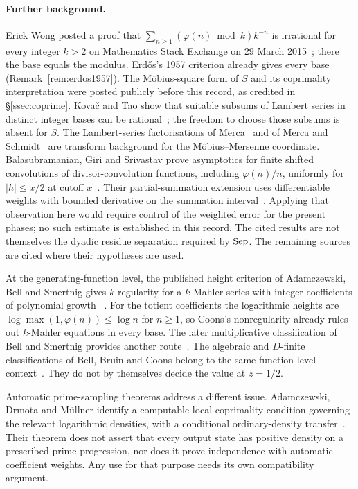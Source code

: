 \documentclass[11pt]{article}
\theoremstyle{plain}
\theoremstyle{definition}
\theoremstyle{remark}
\let\origmathrm\mathrm
\renewcommand{\mathrm}[1]{\ifmmode\origmathrm{#1}\else\textrm{#1}\fi}%
\newcommand{\ph}{\varphi}
\begin{document}
\paragraph{Further background.}
Erick Wong posted a proof that
$\sum_{n\ge1}(\varphi(n)\bmod k)k^{-n}$ is irrational for every integer $k>2$
on Mathematics Stack Exchange on 29 March 2015~\cite{wong2015}; there the base
equals the modulus. Erd\H{o}s's 1957 criterion already gives every base
(Remark~\ref{rem:erdos1957}).  The M\"obius-square form of $S$ and its coprimality
interpretation were posted publicly before this record, as credited in
\S\ref{ssec:coprime}.  Kova\v{c} and Tao show that suitable subsums of Lambert
series in distinct integer bases can be rational~\cite[Theorem~2.3]{kovac-tao};
the freedom to choose those subsums is absent for $S$.  The Lambert-series
factorisations of Merca~\cite[Theorem~1.2]{merca2017} and of Merca and
Schmidt~\cite{merca-schmidt} are transform background for the
M\"obius--Mersenne coordinate.  Balasubramanian, Giri and Srivastav prove
asymptotics for finite shifted convolutions of divisor-convolution
functions, including $\varphi(n)/n$, uniformly for $|h|\le x/2$ at
cutoff $x$~\cite[Theorem~2.2]{bgs2016}. Their partial-summation extension
uses differentiable weights with bounded derivative on the summation
interval~\cite[Rem.~2.9]{bgs2016}.
Applying that observation here would require control of the weighted
error for the present phases; no such estimate is established in this
record. The cited results are not themselves the dyadic residue
separation required by $\mathrm{Sep}$.  The remaining sources are cited where their hypotheses are
used.

At the generating-function level, the published height criterion of
Adamczewski, Bell and Smertnig gives $k$-regularity for a $k$-Mahler
series with integer coefficients of polynomial growth
~\cite[Thm.~1.2(b), p.~2528]{adamczewski-bell-smertnig2023}.
For the totient coefficients the logarithmic heights are
$\log\max(1,\ph(n))\le\log n$ for $n\ge1$, so Coons's nonregularity
already rules out $k$-Mahler equations in every base. The later
multiplicative classification of Bell and Smertnig provides another
route~\cite[Thm.~1.3 and p.~3]{bell-smertnig2026}.
The algebraic and $D$-finite classifications of Bell, Bruin and Coons
belong to the same function-level context~\cite[Thms.~1.5--1.6]{bell-bruin-coons}.
They do not by themselves decide the value at $z=1/2$.

Automatic prime-sampling theorems address a different issue.
Adamczewski, Drmota and M\"ullner identify a computable local coprimality
condition governing the relevant logarithmic densities, with a conditional
ordinary-density transfer~\cite[Thm.~1.4 and Rem.~1.5]{adamczewski-drmota-mullner}.
Their theorem does not assert that every output state has positive density
on a prescribed prime progression, nor does it prove independence with
automatic coefficient weights. Any use for that purpose needs its own
compatibility argument.
\end{document}
